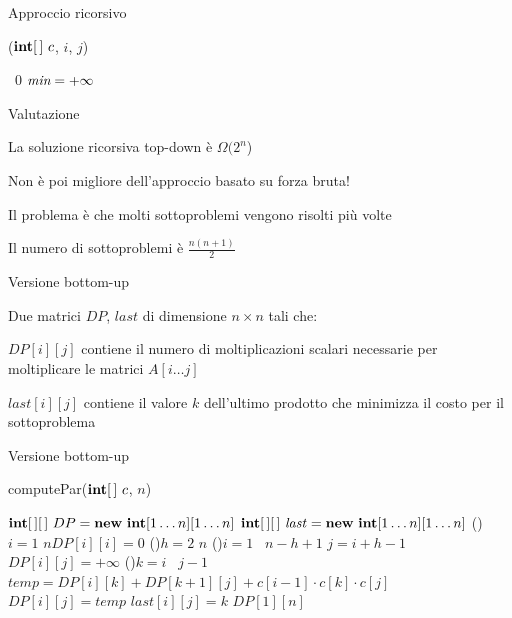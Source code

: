\begin{frame}{Approccio ricorsivo}

\vspace{-6pt}
\begin{Procedure}
\caption[A]{\INTEGER {}($\INTEGER[\,]\ c$, \INTEGER $i$, \INTEGER $j$)}
{ \Return\ $0$\; }
{
  $\textit{min} = +\infty$\;
  \Return \Min\;
}
\end{Procedure}


\end{frame}

\begin{frame}{Valutazione}

\BIL
\item La soluzione ricorsiva top-down è $\Omega(2^n$)
\item Non è poi migliore dell'approccio basato su forza bruta!
\item Il problema è che molti sottoproblemi vengono risolti più volte
\item Il numero di sottoproblemi è $\frac{n(n+1)}{2}$
\EIL

\end{frame}

\begin{frame}{Versione bottom-up}

Due matrici $DP$, $\mathit{last}$ di dimensione $n \times n$ tali che:
\BIL
\item $DP[i][j]$ contiene il numero di moltiplicazioni scalari necessarie
per moltiplicare le matrici $A[i \ldots j]$
\item $\mathit{last}[i][j]$ contiene il valore $k$ dell'ultimo prodotto che minimizza il costo per il sottoproblema
\EIL
\end{frame}

\begin{frame}[shrink=10]{Versione bottom-up}

\vspace{-12pt}
\begin{Procedure}
\caption[A]{\textsf{computePar}($\INTARRAY\ c$, \INTEGER $n$)}	
$\INTARRAY[\,]\ DP = \NEW\ \INTEGER[1 \ldots n][1 \ldots n]$\;
$\INTARRAY[\,]\ \mathit{last} = \NEW\ \INTEGER[1 \ldots n][1 \ldots n]$\;
\For(){$i = 1$ \TO $n$}{$DP[i][i] = 0$\;}
\For(){$h = 2$ \TO $n$}
{
  \For(){$i = 1$ \TO\ $n-h+1$}
  {
    \INTEGER $j = i+h-1$
    $DP[i][j] = +\infty$\;
    \For(){$k = i$ \TO\ $j-1$} 
    {
      \INTEGER\ $\mathit{temp} = DP[i][k] + DP[k+1][j] + c[i-1] \cdot c[k] \cdot c[j]$\;
      {
        $DP[i][j] = \mathit{temp}$\;
        $\mathit{last}[i][j] = k$\;
      }
    }
  }
}
\Return $DP[1][n]$\;
\end{Procedure}

\end{frame}


